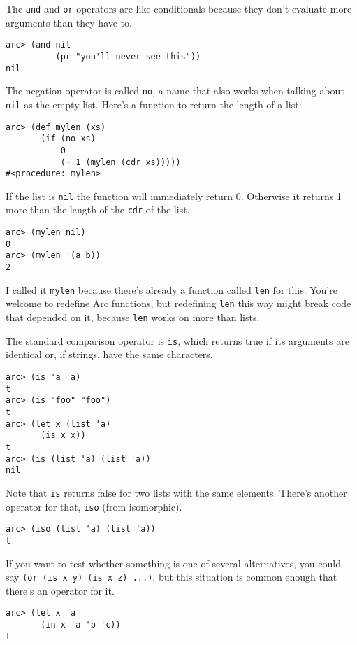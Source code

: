 \documentclass[a4paper,12pt]{book}
\begin{document}
The \verb|and| and \verb|or| operators are like conditionals because they don't
evaluate more arguments than they have to.

\begin{verbatim}
arc> (and nil
          (pr "you'll never see this"))
nil
\end{verbatim}

The negation operator is called \verb|no|, a name that also works when
talking about \verb|nil| as the empty list.  Here's a function to return
the length of a list:

\begin{verbatim}
arc> (def mylen (xs)
       (if (no xs)
           0
           (+ 1 (mylen (cdr xs)))))
#<procedure: mylen>
\end{verbatim}

If the list is \verb|nil| the function will immediately return 0.  Otherwise
it returns 1 more than the length of the \verb|cdr| of the list.

\begin{verbatim}
arc> (mylen nil)
0
arc> (mylen '(a b))
2
\end{verbatim}

I called it \verb|mylen| because there's already a function called \verb|len| for
this.   You're welcome to redefine {\sc{}Arc} functions, but redefining
\verb|len| this way might break code that depended on it, because \verb|len| works
on more than lists.

The standard comparison operator is \verb|is|, which returns true if its
arguments are identical or, if strings, have the same characters. 

\begin{verbatim}
arc> (is 'a 'a)
t
arc> (is "foo" "foo")
t
arc> (let x (list 'a) 
       (is x x))
t
arc> (is (list 'a) (list 'a))
nil
\end{verbatim}

Note that \verb|is| returns false for two lists with the same elements.
There's another operator for that, \verb|iso| (from isomorphic).

\begin{verbatim}
arc> (iso (list 'a) (list 'a))
t
\end{verbatim}

If you want to test whether something is one of several alternatives,
you could say \verb|(or (is x y) (is x z) ...)|, but this situation is
common enough that there's an operator for it.

\begin{verbatim}
arc> (let x 'a   
       (in x 'a 'b 'c))
t
\end{verbatim}
\end{document}
